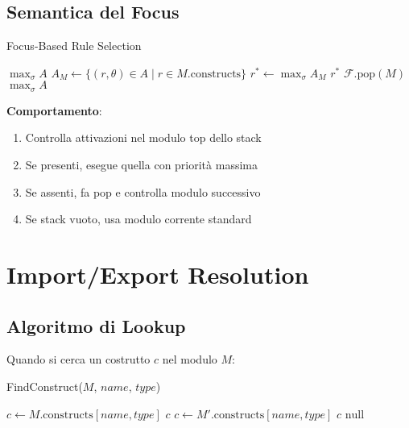 \subsection{Semantica del Focus}

\begin{algorithm}[H]
\caption{Focus-Based Rule Selection}
\begin{algorithmic}[1]
        \State \Return $\max_\sigma A$ 
    \EndIf
        \State $A_M \gets \{(r, \theta) \in A \mid r \in M.\text{constructs}\}$
            \State $r^* \gets \max_\sigma A_M$
            \State \Return $r^*$
        \Else
            \State $\mathcal{F}.\text{pop}(M)$ 
        \EndIf
    \EndFor
    \State \Return $\max_\sigma A$ 
\EndFunction
\end{algorithmic}
\end{algorithm}

\textbf{Comportamento}:
\begin{enumerate}
\item Controlla attivazioni nel modulo top dello stack
\item Se presenti, esegue quella con priorità massima
\item Se assenti, fa pop e controlla modulo successivo
\item Se stack vuoto, usa modulo corrente standard
\end{enumerate}

\section{Import/Export Resolution}

\subsection{Algoritmo di Lookup}

Quando si cerca un costrutto $c$ nel modulo $M$:

\begin{algorithm}[H]
\caption{FindConstruct($M$, $name$, $type$)}
\begin{algorithmic}[1]
\State $c \gets M.\text{constructs}[name, type]$
    \State \Return $c$ 
\EndIf
{}
        \State $c \gets M'.\text{constructs}[name, type]$
            \State \Return $c$ 
        \EndIf
    \EndIf
\EndFor
\State \Return $\text{null}$ 
\end{algorithmic}
\end{algorithm}

